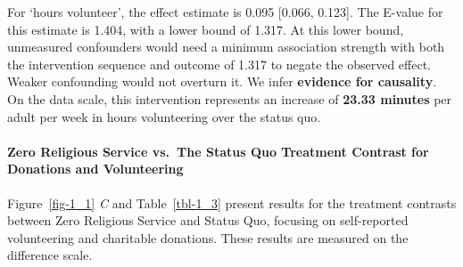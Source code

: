 \documentclass[
  single column]{article}
\let\oldparagraph\paragraph
\renewcommand{\paragraph}[1]{\oldparagraph{#1}\mbox{}}
\begin{document}
For `hours volunteer', the effect estimate is 0.095 {[}0.066, 0.123{]}.
The E-value for this estimate is 1.404, with a lower bound of 1.317. At
this lower bound, unmeasured confounders would need a minimum
association strength with both the intervention sequence and outcome of
1.317 to negate the observed effect. Weaker confounding would not
overturn it. We infer \textbf{evidence for causality}. On the data
scale, this intervention represents an increase of \textbf{23.33 minutes
} per adult per week in hours volunteering over the status quo.

\paragraph{Zero Religious Service vs.~The Status Quo Treatment Contrast
for Donations and
Volunteering}\label{zero-religious-service-vs.-the-status-quo-treatment-contrast-for-donations-and-volunteering}

Figure~\ref{fig-1_1} \emph{C} and Table~\ref{tbl-1_3} present results
for the treatment contrasts between Zero Religious Service and Status
Quo, focusing on self-reported volunteering and charitable donations.
These results are measured on the difference scale.
\end{document}
